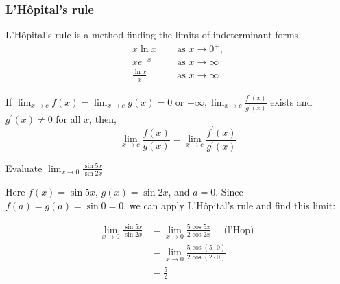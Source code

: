 \subsubsection{ L'Hôpital's rule}
L'Hôpital's rule is a method finding the limits of indeterminant forms. 
\begin{align*}
x \ln x &\quad  \text { as } x  \rightarrow 0^{+}, \\
x e^{-x} & \quad  \text { as } x \rightarrow \infty \\
\frac{\ln x}{x} & \quad   \text { as } x \rightarrow \infty
\end{align*}

\begin{definition}
	If $\lim _{x \rightarrow c} f(x)=\lim _{x \rightarrow c} g(x)=0$ or $\pm \infty, \lim _{x \rightarrow c} \frac{f^{\prime}(x)}{g^{\prime}(x)}$ exists and
	$g^{\prime}(x) \neq 0$ for all $x$, then,
	$$
	\lim _{x \rightarrow c} \frac{f(x)}{g(x)}=\lim _{x \rightarrow c} \frac{f^{\prime}(x)}{g^{\prime}(x)}
	$$
	
\end{definition}
\begin{exercise}
	Evaluate $\lim _{x \rightarrow 0} \frac{\sin 5 x}{\sin 2 x}$
\end{exercise}
\begin{answer}
	Here $f(x)=\sin 5 x$, $g(x)=\sin 2 x$, and $a=0 .$ Since $f(a)=g(a)=\sin 0=0$, we can apply L'Hôpital's rule and find this limit:
	
	\begin{align*}
	\lim _{x \rightarrow 0} \frac{\sin 5 x}{\sin 2 x} &=\lim _{x \rightarrow 0} \frac{5 \cos 5 x}{2 \cos 2 x} \quad \text { (l'Hop) } \\
	&=\lim _{x \rightarrow 0} \frac{5 \cos (5 \cdot 0)}{2 \cos (2 \cdot 0)} \\
	&=\frac{5}{2}
	\end{align*}
	
\end{answer}
